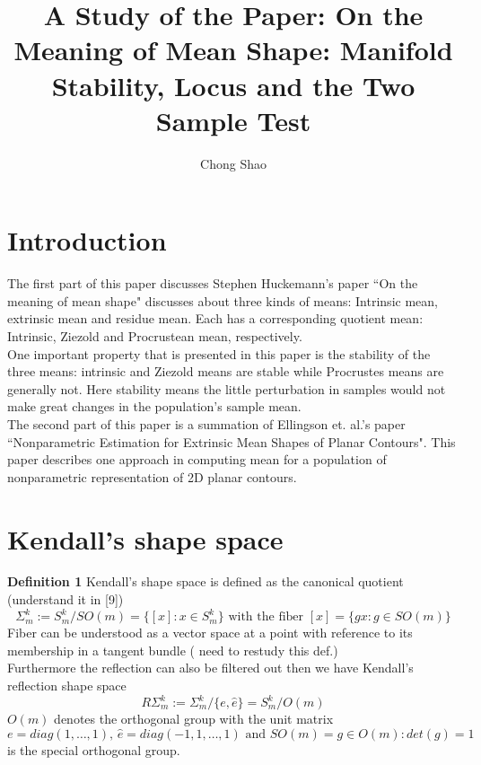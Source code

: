 \documentclass[12pt]{article}
\theoremstyle{definition}
\theoremstyle{remark}
\numberwithin{equation}{section}
\begin{document}
\title{
A Study of the Paper: On the Meaning of Mean Shape: Manifold Stability, Locus and the Two Sample Test}%
\author{Chong Shao}%

\maketitle
\section{Introduction}
The first part of this paper discusses Stephen Huckemann's paper ``On the meaning of mean shape" discusses about three kinds of means: Intrinsic mean, extrinsic mean and residue mean. Each has a corresponding quotient mean: Intrinsic, Ziezold and Procrustean mean, respectively. \\[0.2cm]
One important property that is presented in this paper is the stability of the three means: intrinsic and Ziezold means are stable while Procrustes means are generally not. Here stability means the little perturbation in samples would not make great changes in the population's sample mean. \\[0.2cm]
The second part of this paper is a summation of Ellingson et. al.'s paper ``Nonparametric Estimation for Extrinsic Mean Shapes of Planar Contours". This paper describes one approach in computing mean for a population of nonparametric representation of 2D planar contours.
\section{Kendall's shape space}
\textbf{Definition 1}
Kendall's shape space is defined as the canonical quotient (understand it in [9])
\[\Sigma_m^k := S_m^k / SO(m) = \{[x]:x\in S_m^k\} \text{ with the fiber } [x] = \{gx : g \in SO(m)\}\]
Fiber can be understood as a vector space at a point with reference to its membership in a tangent bundle ( need to restudy this def.)\\[0.2cm]
Furthermore the reflection can also be filtered out then we have Kendall's reflection shape space
\[R\Sigma_m^k := \Sigma_m^k / \{e,\hat{e}\} = S_m^k / O(m)\]
$O(m)$ denotes the orthogonal group with the unit matrix $e = diag(1,\dots,1)\text{, } \hat{e} = diag(-1, 1, \dots, 1) \text{ and } SO(m) = {g \in O(m): det(g) = 1}$ is the special orthogonal group.
\end{document}
